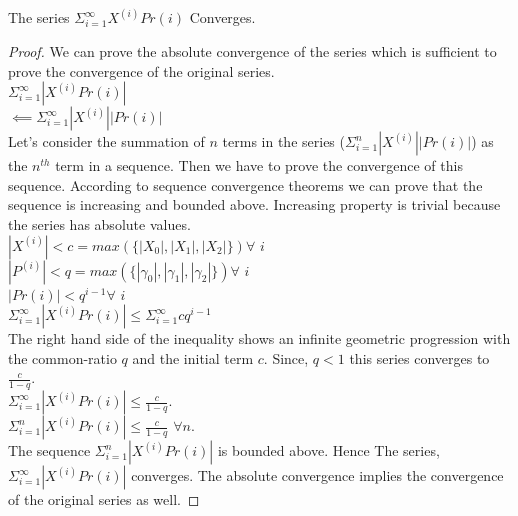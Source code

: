 \begin{lemma}\label{lem:conv}
	The series  $\Sigma_{i=1}^{\infty} X^{(i)}Pr(i)$ Converges.
\end{lemma}
\begin{proof}
	We can prove the absolute convergence of  the series which is sufficient to prove the convergence of the original series. \\
	$\Sigma_{i=1}^{\infty} |X^{(i)}Pr(i)|$\\
	$\impliedby \Sigma_{i=1}^{\infty} |X^{(i)}||Pr(i)|$ \\
	Let's consider the summation of $n$ terms in the series ($\Sigma_{i=1}^{n} |X^{(i)}||Pr(i)|$) as the $n^{th}$ term in a sequence. Then we have to prove the convergence of this sequence. According to  sequence convergence theorems we can prove that the sequence is increasing and bounded above. Increasing property is trivial because the series has absolute values.\\
	$|X^{(i)}| < c=max(\{ |X_0|, |X_1|, |X_2| \}) \forall$ $i$\\
	$|P^{(i)}| < q=max(\{ |\gamma_0|, |\gamma_1|, |\gamma_2| \}) \forall$ $i$\\
	$|Pr(i)| < q^{i-1} \forall$ $i$\\
	$\Sigma_{i=1}^{\infty} |X^{(i)}Pr(i)| \le \Sigma_{i=1}^{\infty} cq^{i-1}$\\
	The right hand side of the inequality shows an infinite geometric progression with the common-ratio $q$ and the initial term $c$. Since, $q < 1$ this series converges to $\frac{c}{1-q}$. \\
	$\Sigma_{i=1}^{\infty} |X^{(i)}Pr(i)| \le \frac{c}{1-q}$.\\
	$\Sigma_{i=1}^{n} |X^{(i)}Pr(i)| \le \frac{c}{1-q}$ $\forall n$. \\
	The sequence $\Sigma_{i=1}^{n} |X^{(i)}Pr(i)|$ is bounded above. Hence The series,\\
	$\Sigma_{i=1}^{\infty} |X^{(i)}Pr(i)|$ converges. The absolute convergence implies the convergence of the original series as well.
\end{proof}

